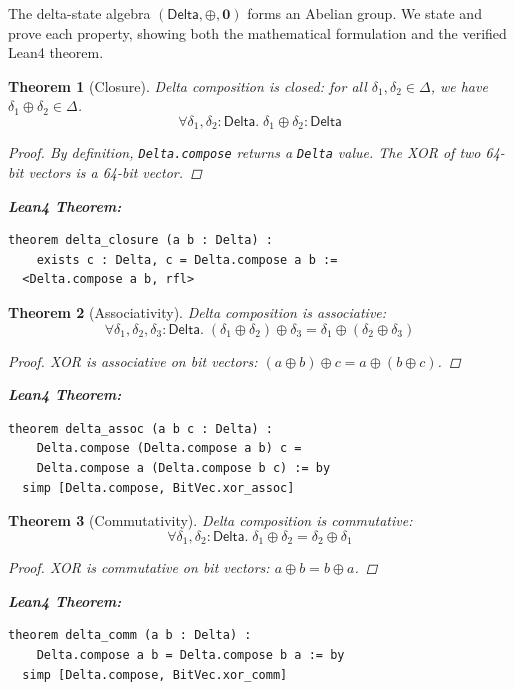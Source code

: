 \documentclass[11pt,letterpaper]{article}
\theoremstyle{plain}
\newtheorem{theorem}{Theorem}[section]
\theoremstyle{definition}
\theoremstyle{remark}
\newcommand{\dcompose}{\oplus}           %
\newcommand{\dzero}{\mathbf{0}}          %
\newcommand{\DeltaType}{\mathsf{Delta}}
\begin{document}
The delta-state algebra $(\DeltaType, \dcompose, \dzero)$ forms an Abelian group. We state and prove each property, showing both the mathematical formulation and the verified Lean4 theorem.

\begin{theorem}[Closure]
\label{thm:closure}
Delta composition is closed: for all $\delta_1, \delta_2 \in \Delta$, we have $\delta_1 \dcompose \delta_2 \in \Delta$.
\[
\forall \delta_1, \delta_2 : \DeltaType.\; \delta_1 \dcompose \delta_2 : \DeltaType
\]

\begin{proof}
By definition, \texttt{Delta.compose} returns a \texttt{Delta} value. The XOR of two 64-bit vectors is a 64-bit vector.
\end{proof}

\medskip
\noindent\textbf{Lean4 Theorem:}
\begin{lstlisting}
theorem delta_closure (a b : Delta) : 
    exists c : Delta, c = Delta.compose a b := 
  <Delta.compose a b, rfl>
\end{lstlisting}
\end{theorem}

\begin{theorem}[Associativity]
\label{thm:assoc}
Delta composition is associative:
\[
\forall \delta_1, \delta_2, \delta_3 : \DeltaType.\; (\delta_1 \dcompose \delta_2) \dcompose \delta_3 = \delta_1 \dcompose (\delta_2 \dcompose \delta_3)
\]

\begin{proof}
XOR is associative on bit vectors: $(a \oplus b) \oplus c = a \oplus (b \oplus c)$.
\end{proof}

\medskip
\noindent\textbf{Lean4 Theorem:}
\begin{lstlisting}
theorem delta_assoc (a b c : Delta) :
    Delta.compose (Delta.compose a b) c = 
    Delta.compose a (Delta.compose b c) := by
  simp [Delta.compose, BitVec.xor_assoc]
\end{lstlisting}
\end{theorem}

\begin{theorem}[Commutativity]
\label{thm:comm}
Delta composition is commutative:
\[
\forall \delta_1, \delta_2 : \DeltaType.\; \delta_1 \dcompose \delta_2 = \delta_2 \dcompose \delta_1
\]

\begin{proof}
XOR is commutative on bit vectors: $a \oplus b = b \oplus a$.
\end{proof}

\medskip
\noindent\textbf{Lean4 Theorem:}
\begin{lstlisting}
theorem delta_comm (a b : Delta) :
    Delta.compose a b = Delta.compose b a := by
  simp [Delta.compose, BitVec.xor_comm]
\end{lstlisting}
\end{theorem}
\end{document}
